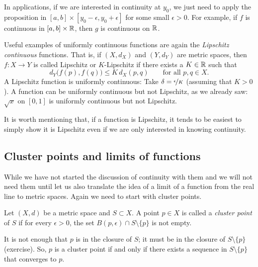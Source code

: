 In applications, if we are interested in continuity at $y_0$, we just
need to apply the proposition in $[a,b] \times [y_0-\epsilon,y_0+\epsilon]$
for some small $\epsilon > 0$.  For example, if $f$ is continuous in
$[a,b] \times {\mathbb{R}}$, then $g$ is continuous on ${\mathbb{R}}$.

\begin{example}
Useful examples of uniformly continuous functions are again the
\emph{Lipschitz continuous}%
%
functions.  That is, if
$(X,d_X)$ and $(Y,d_Y)$ are metric spaces, then $f \colon X \to Y$
is called Lipschitz or $K$-Lipschitz if there exists a $K \in {\mathbb{R}}$ such that
\begin{equation*}
d_Y\bigl(f(p),f(q)\bigr) \leq K \, d_X(p,q)
\qquad \text{for all } p,q \in X.
\end{equation*}
A Lipschitz function is uniformly continuous:
Take $\delta = \nicefrac{\epsilon}{K}$ (assuming that $K > 0$).
A function can be uniformly continuous
but not Lipschitz,
as we already saw: $\sqrt{x}$ on $[0,1]$
is uniformly continuous but not Lipschitz.

It is worth mentioning that,
if a function is Lipschitz, it tends to be
easiest to simply show it is Lipschitz even if we are only
interested in knowing continuity.
\end{example}

\subsection{Cluster points and limits of functions}

While we have not started the discussion of continuity with them and
we will not need them until
let us also
translate the idea of a limit of a function from the real line to metric
spaces.
Again we need to start with cluster points.

\begin{defn}
Let $(X,d)$ be a metric space and
$S \subset X$. A point $p \in X$ is called
a \emph{cluster point} of $S$
if for every $\epsilon > 0$, the set $B(p,\epsilon) \cap S
\setminus \{ p \}$ is not empty.
\end{defn}

It is not enough that $p$ is in the closure of $S$;
it must be in the closure of
$S \setminus \{ p \}$ (exercise).
So, $p$ is a cluster point if and only if there exists a sequence in $S \setminus
\{ p \}$ that converges to $p$.

